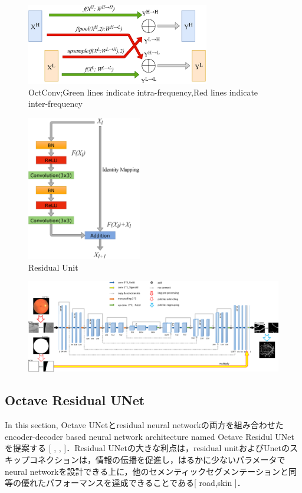 \documentclass{article}
\begin{document}
\begin{figure}[t]
\begin{center}
\includegraphics[width=80mm]{fig1.eps}
\caption{OctConv;Green lines indicate intra-frequency,Red lines indicate inter-frequency }
\end{center}
\end{figure}

\begin{figure}[t]
\begin{center}
\includegraphics[width=50mm]{fig2.eps}
\caption{Residual Unit}
\end{center}
\end{figure}
\begin{figure}[t]
\begin{center}
\includegraphics[width=170mm]{fig5.eps}
\caption{}
\end{center}
\end{figure}
\subsection{Octave Residual UNet}
In this section, Octave UNetとresidual neural networkの両方を組み合わせたencoder-decoder based neural network architecture named Octave Residul UNetを提案する [ , , ]．Residual UNetの大きな利点は，residual unitおよびUnetのスキップコネクションは，情報の伝播を促進し，はるかに少ないパラメータでneural networkを設計できる上に，他のセメンティックセグメンテーションと同等の優れたパフォーマンスを達成できることである[ road,skin ]．
\end{document}
